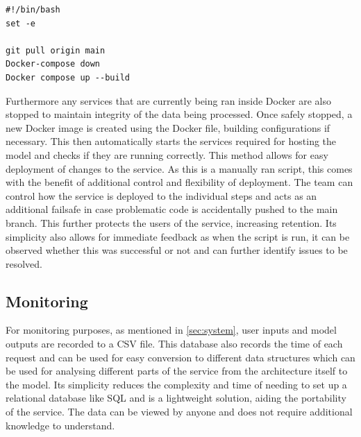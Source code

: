 \documentclass{surreydissertation}
\begin{document}

\begin{lstlisting}[style=bash, caption={\texttt{deploy.sh} Bash Script}, label={lst:script}]
#!/bin/bash
set -e

git pull origin main
Docker-compose down
Docker compose up --build
\end{lstlisting}

Furthermore any services that are currently being ran inside Docker are also stopped to maintain integrity of the data being processed. Once safely stopped, a new Docker image is created using the Docker file, building configurations if necessary. This then automatically starts the services required for hosting the model and checks if they are running correctly. This method allows for easy deployment of changes to the service. As this is a manually ran script, this comes with the benefit of additional control and flexibility of deployment. The team can control how the service is deployed to the individual steps and acts as an additional failsafe in case problematic code is accidentally pushed to the main branch. This further protects the users of the service, increasing retention. Its simplicity also allows for immediate feedback as when the script is run, it can be observed whether
 this was successful or not and can further identify issues to be resolved. 

\subsection{Monitoring}
For monitoring purposes, as mentioned
in \autoref{sec:system},
user inputs and model outputs are recorded to a CSV file. This database also records the time of each request and can be used for easy conversion to different data structures which can be used for analysing different parts of the service from the architecture itself to the model. Its simplicity reduces the complexity and time of needing to set up a relational database like SQL and is a lightweight solution, aiding the portability of the service. The data can be viewed by anyone and does not require additional knowledge to understand.
\end{document}
